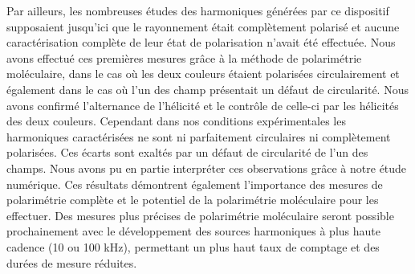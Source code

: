 Par ailleurs, les nombreuses études des harmoniques générées par ce dispositif supposaient jusqu'ici que le rayonnement était complètement polarisé et aucune caractérisation complète de leur état de polarisation n'avait été effectuée. Nous avons effectué ces premières mesures grâce à la méthode de polarimétrie moléculaire, dans le cas où les deux couleurs étaient polarisées circulairement et également dans le cas où l'un des champ présentait un défaut de circularité. Nous avons confirmé l'alternance de l'hélicité et le contrôle de celle-ci par les hélicités des deux couleurs. Cependant dans nos conditions expérimentales les harmoniques caractérisées ne sont ni parfaitement circulaires ni complètement polarisées. Ces écarts sont exaltés par un défaut de circularité de l'un des champs. Nous avons pu en partie interpréter ces observations grâce à notre étude numérique. Ces résultats démontrent également l'importance des mesures de polarimétrie complète et le potentiel de la polarimétrie moléculaire pour les effectuer. Des mesures plus précises de polarimétrie moléculaire seront possible prochainement avec le développement des sources harmoniques à plus haute cadence (10 ou 100 kHz), permettant un plus haut taux de comptage et des durées de mesure réduites.


